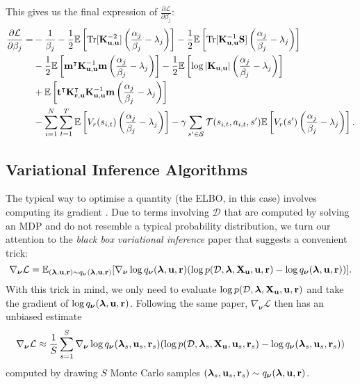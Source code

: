 \documentclass{mprop}
\theoremstyle{definition}
\DeclareMathOperator{\Tr}{Tr}
\begin{document}
This gives us the final expression of $\frac{\partial\mathcal{L}}{\partial\beta_j}$:
\[
  \begin{split}
    \frac{\partial\mathcal{L}}{\partial\beta_j} = &- \frac{1}{\beta_j} -
    \frac{1}{2}\mathbb{E} \left[ \Tr[\Kuu^{-2}] \left( \frac{\alpha_j}{\beta_j}
        - \lambda_j \right) \right] - \frac{1}{2}\mathbb{E} \left[
      \Tr[\Kuu^{-1}\mathbf{S}] \left(\frac{\alpha_j}{\beta_j} - \lambda_j
      \right) \right] \\
    &- \frac{1}{2}\mathbb{E} \left[ \mathbf{m}^\intercal\Kuu^{-1}\mathbf{m}
      \left(\frac{\alpha_j}{\beta_j} - \lambda_j \right) \right] -
    \frac{1}{2}\mathbb{E} \left[ \log|\Kuu| \left(\frac{\alpha_j}{\beta_j} -
        \lambda_j \right) \right] \\
    &+ \mathbb{E} \left[ \mathbf{t}^\intercal\Kru^\intercal\Kuu^{-1}\mathbf{m}
      \left(\frac{\alpha_j}{\beta_j} - \lambda_j \right) \right] \\
    &- \sum_{i=1}^N \sum_{t=1}^T \mathbb{E} \left[ V_r(s_{i,t})
      \left(\frac{\alpha_j}{\beta_j} - \lambda_j \right) \right] -
    \gamma\sum_{s' \in \mathcal{S}} \mathcal{T}(s_{i,t}, a_{i,t}, s')\mathbb{E}
    \left[V_r(s') \left(\frac{\alpha_j}{\beta_j} - \lambda_j \right) \right].
  \end{split}
\]

\subsection{Variational Inference Algorithms} \label{vi_algs}

The typical way to optimise a quantity (the ELBO, in this case) involves
computing its gradient \cite{blei2017variational}. Due to terms involving
$\mathcal{D}$ that are computed by solving an MDP and do not resemble a typical
probability distribution, we turn our attention to the \emph{black box
  variational inference} \cite{DBLP:conf/aistats/RanganathGB14} paper that
suggests a convenient trick:
\[ \nabla_{\bm\nu} \mathcal{L} = \mathbb{E}_{(\bm\lambda, \mathbf{u}, \mathbf{r}) \sim q_{\bm\nu}(\bm\lambda, \mathbf{u}, \mathbf{r})}[\nabla_{\bm\nu} \log q_{\bm\nu}(\bm\lambda, \mathbf{u}, \mathbf{r})
  (\log p(\mathcal{D}, \bm\lambda, \mathbf{X_u}, \mathbf{u}, \mathbf{r}) - \log q_{\bm\nu}(\bm\lambda, \mathbf{u}, \mathbf{r}))]. \]
With this trick in mind, we only need to evaluate $\log p(\mathcal{D}, \bm\lambda, \mathbf{X_u}, \mathbf{u}, \mathbf{r})$ and take the
gradient of $\log q_{\bm\nu}(\bm\lambda, \mathbf{u}, \mathbf{r})$. Following the same paper,
$\nabla_{\bm\nu} \mathcal{L}$ then has an unbiased estimate
\[ \nabla_{\bm\nu} \mathcal{L} \approx \frac{1}{S} \sum_{s=1}^S
  \nabla_{\bm\nu} \log q_{\bm\nu}(\bm\lambda_s, \mathbf{u}_s, \mathbf{r}_s) (\log p(\mathcal{D}, \bm\lambda_s, \mathbf{X_u}, \mathbf{u}_s, \mathbf{r}_s) - \log
  q_{\bm\nu}(\bm\lambda_s, \mathbf{u}_s, \mathbf{r}_s)) \]
computed by drawing $S$ Monte Carlo samples $(\bm\lambda_s, \mathbf{u}_s,
\mathbf{r}_s) \sim q_{\bm\nu}(\bm\lambda, \mathbf{u}, \mathbf{r})$.
\end{document}
